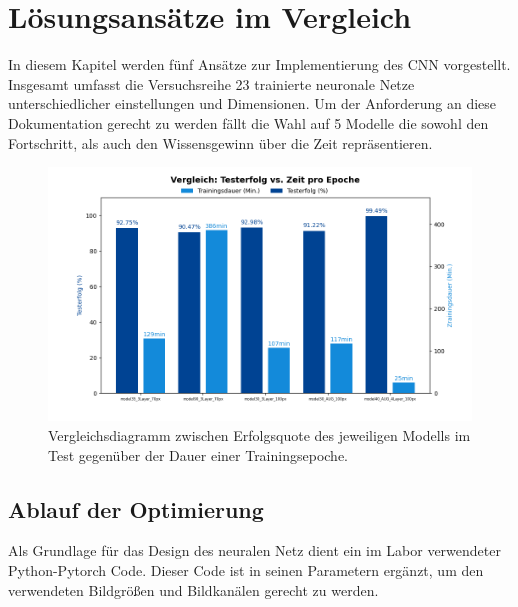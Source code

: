 \documentclass[journal,twoside,web]{ieeecolor}
\begin{document}


\section{Lösungsansätze im Vergleich}
In diesem Kapitel werden fünf Ansätze zur Implementierung des CNN vorgestellt. Insgesamt umfasst die Versuchsreihe 23 trainierte neuronale Netze unterschiedlicher einstellungen und Dimensionen.
Um der Anforderung an diese Dokumentation gerecht zu werden fällt die Wahl auf 5 Modelle die sowohl den Fortschritt, als auch den Wissensgewinn über die Zeit repräsentieren.

\begin{figure}[H]
    \centerline{\includegraphics[width=\columnwidth]{Erfolg_Dauer.png}}
    \caption{Vergleichsdiagramm zwischen Erfolgsquote des jeweiligen Modells im Test gegenüber der Dauer einer Trainingsepoche.}
    \label{fig:compareGraph}
\end{figure}

\subsection{Ablauf der Optimierung}
\label{sec:optimization}
Als Grundlage für das Design des neuralen Netz dient ein im Labor verwendeter Python-Pytorch Code. Dieser Code ist in seinen Parametern ergänzt, um den verwendeten Bildgrößen und Bildkanälen gerecht zu werden. 
\end{document}
